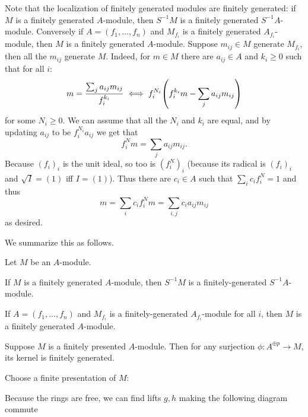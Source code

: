 Note that the localization of finitely generated modules are finitely generated: if $M$ is a finitely generated $A$-module, then $S^{-1}M$ is a finitely generated $S^{-1}A$-module.
Conversely if $A=(f_1,\dots,f_n)$ and $M_{f_i}$ is a finitely generated $A_{f_i}$-module, then $M$ is a finitely generated $A$-module.
Suppose $m_{ij}\in M$ generate $M_{f_i}$, then all the $m_{ij}$ generate $M$.
Indeed, for $m\in M$ there are $a_{ij}\in A$ and $k_i\geq0$ such that for all $i$:
$$ m = {{\sum_j a_{ij}m_{ij}}\over{f_i^{k_i}}} \iff f_i^{N_i}\mathopen{}\mathclose{\left(f_i^{k_i}m - \sum_j a_{ij}m_{ij}\right)} $$
for some $N_i\geq0$.
We can assume that all the $N_i$ and $k_i$ are equal, and by updating $a_{ij}$ to be $f_i^{N_i}a_{ij}$ we get that
$$ f_i^Nm = \sum_ja_{ij}m_{ij} . $$
Because $(f_i)_i$ is the unit ideal, so too is $(f_i^N)_i$ (because its radical is $(f_i)_i$ and $\sqrt I=(1)$ iff $I=(1)$).
Thus there are $c_i\in A$ such that $\sum_ic_if_i^N=1$ and thus
$$ m = \sum_ic_if_i^Nm = \sum_{i,j}c_ia_{ij}m_{ij} $$
as desired.

We summarize this as follows.

\bprop

    Let $M$ be an $A$-module.
    \benum
        \item If $M$ is a finitely generated $A$-module, then $S^{-1}M$ is a finitely-generated $S^{-1}A$-module.
        \item If $A=(f_1,\dots,f_n)$ and $M_{f_i}$ is a finitely-generated $A_{f_i}$-module for all $i$, then $M$ is a finitely generated $A$-module.
    \eenum

\eprop

\blemm

    Suppose $M$ is a finitely presented $A$-module.
    Then for any surjection $\phi\colon A^{\oplus p}\to M$, its kernel is finitely generated.

\elemm

\bproof

    Choose a finite presentation of $M$:


    Because the rings are free, we can find lifts $g,h$ making the following diagram commute

